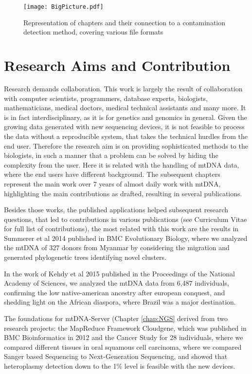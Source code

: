 \begin{figure}[ht]
\begin{center}
\texttt{[image: BigPicture.pdf]}
\caption[Representation of chapters]{Representation of chapters and their connection to a contamination detection method, covering various file formats }
\label{fig:figureBigPic}
\end{center}
\end{figure}

\section{Research Aims and Contribution}
Research demands collaboration. This work is largely the result of collaboration with computer scientists, programmers, database experts, biologists, mathematicians, medical doctors, medical technical assistants and many more. It is in fact interdisciplinary, as it is for genetics and genomics in general. Given the growing data generated with new sequencing devices, it is not feasible to process the data without a reproducible system, that takes the technical hurdles from the end user. Therefore the research aim is on providing sophisticated methods to the biologists, in such a manner that a problem can be solved by hiding the complexity from the user. Here it is related with the handling of mtDNA data, where the end users have different background. The subsequent chapters represent the main work over 7 years of almost daily work with mtDNA, highlighting the main contributions as drafted, resulting in several publications. 

Besides those works, the published applications helped subsequent research questions, that led to contributions in various publications (see Curriculum Vitae for full list of contributions), the most related with this work are the results in Summerer et al 2014 published in BMC Evolutionary Biology, \cite{Summerer2014} where we analyzed the mtDNA of 327 donors from Myanmar by considering the migration and generated phylogenetic trees identifying novel clusters. 

In the work of Kehdy et al 2015 \cite{Kehdy2015} published in the Proceedings of the National Academy of Sciences, we analyzed the mtDNA data from 6,487 individuals, confirming the low native-american ancestry after european conquest, and shedding light on the African diaspora, where Brazil was a major destination.

The foundations for mtDNA-Server (Chapter \ref{chap:NGS} derived from two research projects: the MapReduce Framework Cloudgene\cite{Schonherr2012}, which was published in BMC Bioinformatics in 2012 and the Cancer Study for 28 individuals, where we compared different tissues in oral squamous cell carcinoma\cite{Kloss-Brandstatter2015}, where we compared Sanger based Sequencing to Next-Generation Sequencing, and showed that heteroplasmy detection down to the 1\% level is feasible with the new devices. 

